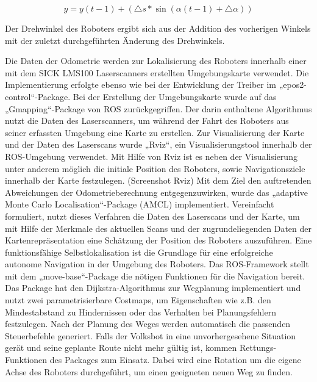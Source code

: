 \begin{equation}
y = y(t-1) + (\triangle s * \sin (\alpha (t-1) + \triangle \alpha))
\end{equation} 

Der Drehwinkel des Roboters ergibt sich aus der Addition des vorherigen Winkels mit der zuletzt durchgeführten Änderung des Drehwinkels.



Die Daten der Odometrie werden zur Lokalisierung des Roboters innerhalb einer mit dem SICK LMS100 Laserscanners erstellten Umgebungskarte verwendet. Die Implementierung erfolgte ebenso wie bei der Entwicklung der Treiber im „epos2-control“-Package. Bei der Erstellung der Umgebungskarte wurde auf das „Gmapping“-Package von ROS zurückgegriffen. Der darin enthaltene Algorithmus nutzt die Daten des Laserscanners, um während der Fahrt des Roboters aus seiner erfassten Umgebung eine Karte zu erstellen. Zur Visualisierung der Karte und der Daten des Laserscans wurde „Rviz“, ein Visualisierungstool innerhalb der ROS-Umgebung verwendet. Mit Hilfe von Rviz ist es neben der Visualisierung unter anderem möglich die initiale Position des Roboters, sowie Navigationsziele innerhalb der Karte festzulegen. (Screenshot Rviz) Mit dem Ziel den auftretenden Abweichungen der Odometrieberechnung entgegenzuwirken, wurde das „adaptive Monte Carlo Localisation“-Package (AMCL) implementiert. Vereinfacht formuliert, nutzt dieses Verfahren die Daten des Laserscans und der Karte, um mit Hilfe der Merkmale des aktuellen Scans und der zugrundeliegenden Daten der Kartenrepräsentation eine Schätzung der Position des Roboters auszuführen. \cite[S. 6]{Bischoff:2004}
Eine funktionsfähige Selbstlokalisation ist die Grundlage für eine erfolgreiche autonome Navigation in der Umgebung des Roboters. Das ROS-Framework stellt mit dem „move-base“-Package die nötigen Funktionen für die Navigation bereit. Das Package hat den Dijkstra-Algorithmus zur Wegplanung implementiert und nutzt zwei parametrisierbare Costmaps, um Eigenschaften wie z.B. den Mindestabstand zu Hindernissen oder das Verhalten bei Planungsfehlern festzulegen. Nach der Planung des Weges werden automatisch die passenden Steuerbefehle generiert. Falls der Volksbot in eine unvorhergesehene Situation gerät und seine geplante Route nicht mehr gültig ist, kommen Rettungs-Funktionen des Packages zum Einsatz. Dabei wird eine Rotation um die eigene Achse des Roboters durchgeführt, um einen geeigneten neuen Weg zu finden. 

